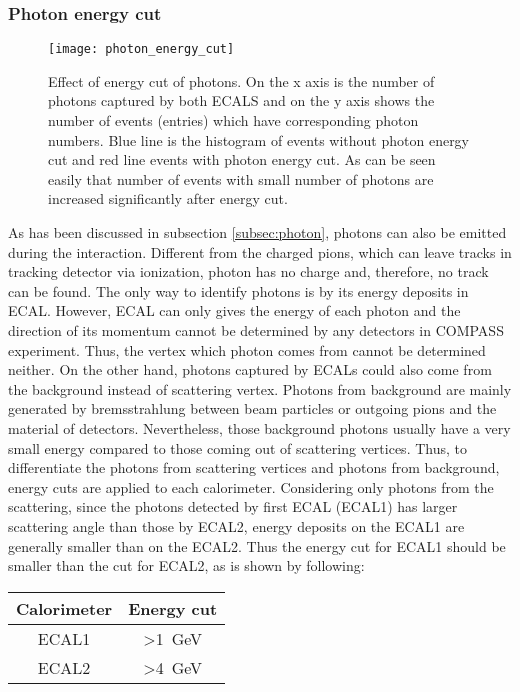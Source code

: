 \subsubsection{Photon energy cut}
\begin{figure}[!t]
	\centering
	\texttt{[image: photon\_energy\_cut]}
	\caption{Effect of energy cut of photons. On the x axis is the number of photons captured by both ECALS and on the y axis shows the number of events (entries) which have corresponding photon numbers. Blue line is the histogram of events without photon energy cut and red line events with photon energy cut. As can be seen easily that number of events with small number of photons are increased significantly after energy cut.}
	\label{fig:photon_energy_cut}
\end{figure}
As has been discussed in subsection \ref{subsec:photon}, photons can also be emitted during the interaction. Different from the charged pions, which can leave tracks in tracking detector via ionization, photon has no charge and, therefore, no track can be found. The only way to identify photons is by its energy deposits in ECAL. However, ECAL can only gives the energy of each photon and the direction of its momentum cannot be determined by any detectors in COMPASS experiment. Thus, the vertex which photon comes from cannot be determined neither. On the other hand, photons captured by ECALs could also come from the background instead of scattering vertex. Photons from background are mainly generated by bremsstrahlung between beam particles or outgoing pions and the material of detectors. Nevertheless, those background photons usually have a very small energy compared to those coming out of scattering vertices. Thus, to differentiate the photons from scattering vertices and photons from background, energy cuts are applied to each calorimeter. Considering only photons from the scattering, since the photons detected by first ECAL (ECAL1) has larger scattering angle than those by ECAL2, energy deposits on the ECAL1 are generally smaller than on the ECAL2. Thus the energy cut for ECAL1 should be smaller than the cut for ECAL2, as is shown by following:

\begin{center}
	\begin{tabular}{c||c}
		Calorimeter & Energy cut      \\
		\hline
		ECAL1       & \textgreater{}\SI{1}{\giga\electronvolt} \\
		\hline
		ECAL2       & \textgreater{}\SI{4}{\giga\electronvolt}
	\end{tabular}
\end{center}



